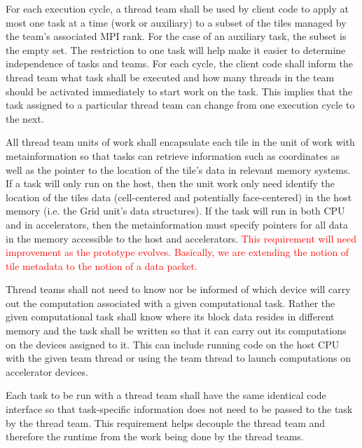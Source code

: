 \documentclass{article}
\begin{document}
\begin{req}
For each execution cycle, a thread team shall be used by client code to apply at
most one task at a time (work or auxiliary) to a subset of the tiles managed by
the team's associated MPI rank.  For the case of an auxiliary task, the subset
is the empty set.  The restriction to one task will help make it easier to
determine independence of tasks and teams.  For each cycle, the client code
shall inform the thread team what task shall be executed and how many threads in
the team should be activated immediately to start work on the task.  This
implies that the task assigned to a particular thread team can change from one
execution cycle to the next.
\end{req}

\begin{req}
All thread team units of work shall encapsulate each tile in the unit of work
with metainformation so that tasks can retrieve information such as coordinates
as well as the pointer to the location of the tile's data in relevant memory
systems.  If a task will only run on the host, then the unit work only need
identify the location of the tiles data (cell-centered and potentially
face-centered) in the host memory (i.e. the Grid unit's data structures).  If
the task will run in both CPU and in accelerators, then the metainformation must
specify pointers for all data in the memory accessible to the host and
accelerators.  \textcolor{red}{This requirement will need improvement as the
prototype evolves.  Basically, we are extending the notion of tile metadata to
the notion of a data packet.}
\end{req}

\begin{req}
Thread teams shall not need to know nor be informed of which device will carry
out the computation associated with a given computational task.  Rather the
given computational task shall know where its block data resides in different
memory and the task shall be written so that it can carry out its computations
on the devices assigned to it.  This can include running code on the host CPU
with the given team thread or using the team thread to launch computations on
accelerator devices.
\end{req}

\begin{req}
Each task to be run with a thread team shall have the same identical code
interface so that task-specific information does not need to be passed to the
task by the thread team.  This requirement helps decouple the thread team and
therefore the runtime from the work being done by the thread teams.
\end{req}
\end{document}
